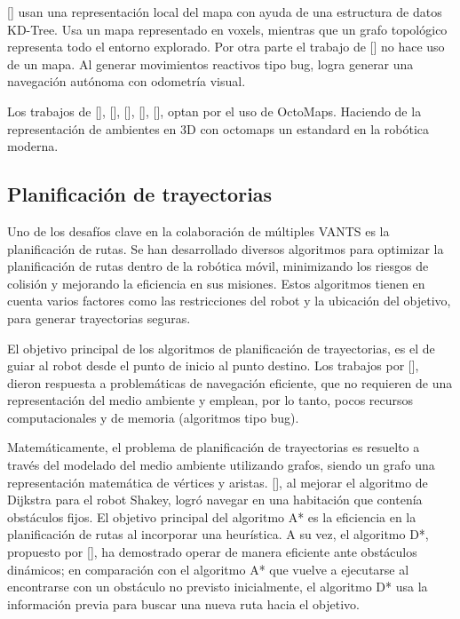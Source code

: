 \citeauthor{COLLINS2019}[] usan una representaci\'{o}n local del mapa con ayuda de una estructura de datos KD-Tree. Usa un mapa representado en voxels, mientras que un grafo topol\'{o}gico representa todo el entorno explorado. Por otra parte el trabajo de \citeauthor{BUG2019}[] no hace uso de un mapa. Al generar movimientos reactivos tipo bug, logra generar una navegación autónoma con odometría visual.

Los trabajos de \citeauthor{PAPACHRISTOS2017}[], \citeauthor{SELIN2019}[], \citeauthor{CINVES2021}[], \citeauthor{RACER2022}[], \citeauthor{BARTOLOMEI2023}[], optan por el uso de OctoMaps. Haciendo de la representación de ambientes en 3D con octomaps un estandard en la robótica moderna.

\subsection{Planificación de trayectorias}

Uno de los desaf\'{i}os clave en la colaboraci\'{o}n de m\'{u}ltiples VANTS es la planificaci\'{o}n de rutas. Se han desarrollado diversos algoritmos para optimizar la planificaci\'{o}n de rutas dentro de la rob\'{o}tica m\'{o}vil, minimizando los riesgos de colisi\'{o}n y mejorando la eficiencia en sus misiones. Estos algoritmos tienen en cuenta varios factores como las restricciones del robot y la ubicación del objetivo, para generar trayectorias seguras.

El objetivo principal de los algoritmos de planificación de trayectorias, es el de guiar al robot desde el punto de inicio al punto destino. Los trabajos por \citeauthor{Lumelsky1987}[], dieron respuesta a problemáticas de navegaci\'{o}n eficiente, que no requieren de una representación del medio ambiente y emplean, por lo tanto, pocos recursos computacionales y de memoria (algoritmos tipo bug).


Matem\'{a}ticamente, el problema de planificación de trayectorias es resuelto a través del modelado del medio ambiente utilizando grafos, siendo un grafo una representaci\'{o}n matem\'{a}tica de v\'{e}rtices y aristas. \citeauthor{4082128}[], al mejorar el algoritmo de Dijkstra para el robot Shakey, logr\'{o} navegar en una habitaci\'{o}n que conten\'{i}a obst\'{a}culos fijos. El objetivo principal del algoritmo A* es la eficiencia en la planificaci\'{o}n de rutas al incorporar una heurística. A su vez, el algoritmo D*, propuesto por \citeauthor{351061}[], ha demostrado operar de manera eficiente ante obst\'{a}culos din\'{a}micos; en comparaci\'{o}n con el algoritmo A* que vuelve a ejecutarse al encontrarse con un obst\'{a}culo no previsto inicialmente, el algoritmo D* usa la informaci\'{o}n previa para buscar una nueva ruta hacia el objetivo.

